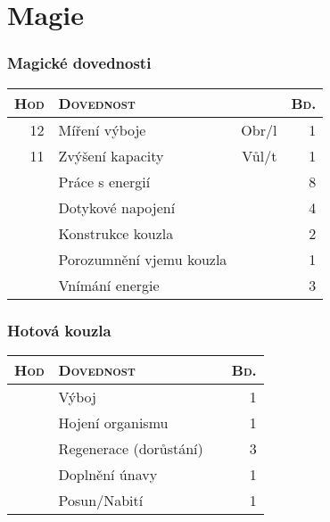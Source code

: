 \documentclass[11pt]{article}
\newenvironment{skilltab}[1][t]
{
\begin{tabular}[#1]{|r|l>{\sc}r|r|} \hline
  \textsc{Hod} & \multicolumn{2}{l|}{\textsc{Dovednost}} & \textsc{Bd.} \\ \hline
}
{
\end{tabular}
}
\begin{document}
\newpage
\begin{minipage}[t][\textheight]{162mm}

\part*{Magie}

  \begin{minipage}[t]{0.48\textwidth}

    \section*{Magické dovednosti}\vspace{-1em}
    \begin{skilltab}
      12 & Míření výboje & Obr/l & 1 \\ \hline
      11 & Zvýšení kapacity & Vůl/t & 1 \\ \hline
        & Práce s energií & & 8 \\ \hline
        & Dotykové napojení & & 4 \\ \hline
        & Konstrukce kouzla & & 2 \\ \hline
        & Porozumnění vjemu kouzla & & 1 \\ \hline
        & Vnímání energie & & 3 \\ \hline
    \end{skilltab}

  \end{minipage}
  \hspace{0.02\textwidth}
  \begin{minipage}[t]{0.48\textwidth}

    \section*{Hotová kouzla}\vspace{-1em}
    \begin{skilltab}
      & Výboj & \hspace{2.7em} & 1 \\ \hline
      & Hojení organismu & & 1 \\ \hline
      & Regenerace (dorůstání) & & 3 \\ \hline
      & Doplnění únavy & & 1 \\ \hline
      & Posun/Nabití & & 1 \\ \hline
    \end{skilltab}


\end{minipage}
\end{minipage}
\end{document}
